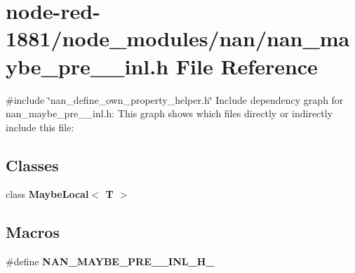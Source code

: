\section{node-\/red-\/1881/node\+\_\+modules/nan/nan\+\_\+maybe\+\_\+pre\+\_\+\_\+inl.h File Reference}
\label{nan__maybe__pre__43__inl_8h}
{\ttfamily \#include \char`\"{}nan\+\_\+define\+\_\+own\+\_\+property\+\_\+helper.\+h\char`\"{}}\newline
Include dependency graph for nan\+\_\+maybe\+\_\+pre\+\_\+\_\+inl.\+h\+:
This graph shows which files directly or indirectly include this file\+:
\subsection*{Classes}
\begin{DoxyCompactItemize}
\item 
class \textbf{ Maybe\+Local$<$ T $>$}
\end{DoxyCompactItemize}
\subsection*{Macros}
\begin{DoxyCompactItemize}
\item 
\#define \textbf{ N\+A\+N\+\_\+\+M\+A\+Y\+B\+E\+\_\+\+P\+R\+E\+\_\+\_\+\+I\+N\+L\+\_\+\+H\+\_\+}
\end{DoxyCompactItemize}
